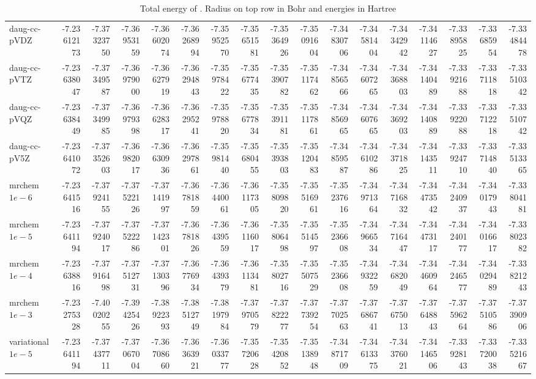 \documentclass[../Thesis.tex]{subfiles}
\begin{document}
\begin{sidewaystable}
{{\begin{tabular}{l|r|r|r|r|r|r|r|r|r|r|r|r|r|r|r|r}
daug-cc-pVDZ & -7.23612173 & -7.37323750 & -7.36953159 & -7.36602074 & -7.36268994 & -7.35952570 & -7.35651581 & -7.35364926 & -7.35091604 & -7.34830706 & -7.34581404 & -7.34342942 & -7.34114627 & -7.33895825 & -7.33685954 & -7.33484478 \\
daug-cc-pVTZ & -7.23638047 & -7.37349587 & -7.36979000 & -7.36627919 & -7.36294843 & -7.35978422 & -7.35677435 & -7.35390782 & -7.35117462 & -7.34856566 & -7.34607265 & -7.34368803 & -7.34140489 & -7.33921688 & -7.33711818 & -7.33510342 \\
daug-cc-pVQZ & -7.23638449 & -7.37349985 & -7.36979398 & -7.36628317 & -7.36295241 & -7.35978820 & -7.35677834 & -7.35391181 & -7.35117861 & -7.34856965 & -7.34607665 & -7.34369203 & -7.34140889 & -7.33922088 & -7.33712218 & -7.33510742 \\
daug-cc-pV5Z & -7.23641072 & -7.37352603 & -7.36982017 & -7.36630936 & -7.36297861 & -7.35981440 & -7.35680455 & -7.35393803 & -7.35120483 & -7.34859587 & -7.34610286 & -7.34371825 & -7.34143511 & -7.33924710 & -7.33714840 & -7.33513365 \\ \hline
mrchem $1e-6$& -7.23641516 & -7.37924155 & -7.37522126 & -7.37141997 & -7.36781859 & -7.36440061 & -7.36117305 & -7.35809820 & -7.35516961 & -7.35237616 & -7.34971364 & -7.34716832 & -7.34473542 & -7.34240937 & -7.34017943 & -7.33804181 \\
mrchem $1e-5$& -7.23641194 & -7.37924017 & -7.37522286 & -7.37142301 & -7.36781826 & -7.36439559 & -7.36116017 & -7.35806498 & -7.35514597 & -7.35236608 & -7.34966534 & -7.34716447 & -7.34473117 & -7.34240177 & -7.34016617 & -7.33802382 \\
mrchem $1e-4$& -7.23638816 & -7.37916498 & -7.37512731 & -7.37130396 & -7.36776934 & -7.36439379 & -7.36113481 & -7.35802716 & -7.35507529 & -7.35236608 & -7.34932259 & -7.34682049 & -7.34460964 & -7.34246577 & -7.34029489 & -7.33821243 \\
mrchem $1e-3$ & -7.23275328 & -7.40020255 & -7.39425426 & -7.38922393 & -7.38512749 & -7.38197984 & -7.37970579 & -7.37822277 & -7.37739254 & -7.37702563 & -7.37686741 & -7.37675013 & -7.37648843 & -7.37596264 & -7.37510586 & -7.37390906 \\
variational $1e-5$ & -7.23641194 & -7.37437711 & -7.37067004 & -7.36708660 & -7.36363921 & -7.36033777 & -7.35720628 & -7.35420852 & -7.35138948 & -7.34871709 & -7.34613375 & -7.34376021 & -7.34146506 & -7.33928143 & -7.33720038 & -7.33521667 \\
\end{tabular}}}{\caption{Total energy of . Radius on top row in Bohr and energies in Hartree}
\label{tab:rawLipdata}}


\end{sidewaystable}
\end{document}
